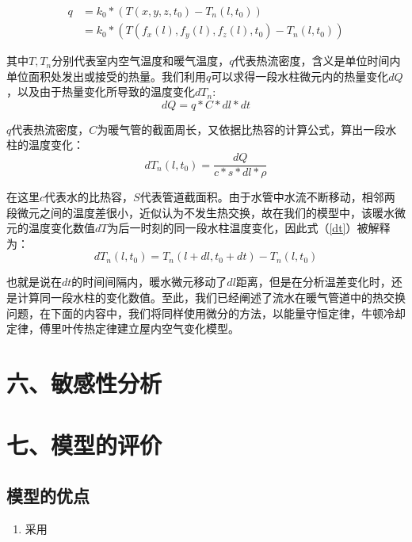 \documentclass{my_paper}
\begin{document}
\begin{equation}
    \begin{aligned}
        q&= k_0*(T(x,y,z,t_0)-T_n(l,t_0))\\
        &= k_0 * (T(f_x(l),f_y(l),f_z(l),t_0)-T_n(l,t_0))
    \end{aligned}
\end{equation}

其中$T,T_n$分别代表室内空气温度和暖气温度，$q$代表热流密度，含义是单位时间内单位面积处发出或接受的热量。我们利用$ q $可以求得一段水柱微元内的热量变化$dQ$，以及由于热量变化所导致的温度变化$dT_n$:
\begin{equation}
    dQ = q* C * dl * dt
\end{equation}

$q$代表热流密度，$C$为暖气管的截面周长，又依据比热容的计算公式，算出一段水柱的温度变化：
\begin{equation}
    dT_n(l,t_0) = \frac{dQ}{c*s*dl*\rho}
    \label{dt}
\end{equation}

在这里$c$代表水的比热容，$S$代表管道截面积。由于水管中水流不断移动，相邻两段微元之间的温度差很小，近似认为不发生热交换，故在我们的模型中，该暖水微元的温度变化数值$dT$为后一时刻的同一段水柱温度变化，因此式（\ref{dt}）被解释为：
\begin{equation}
dT_n(l,t_0) = T_n(l+dl,t_0+dt) - T_n(l,t_0)
\label{}
\end{equation}

也就是说在$ dt $的时间间隔内，暖水微元移动了$dl$距离，但是在分析温差变化时，还是计算同一段水柱的变化数值。至此，我们已经阐述了流水在暖气管道中的热交换问题，在下面的内容中，我们将同样使用微分的方法，以能量守恒定律，牛顿冷却定律，傅里叶传热定律建立屋内空气变化模型。



\section{六、敏感性分析}
\section{七、模型的评价}

\subsection{模型的优点}
\begin{enumerate}
    \item 采用

\end{enumerate}
\end{document}
